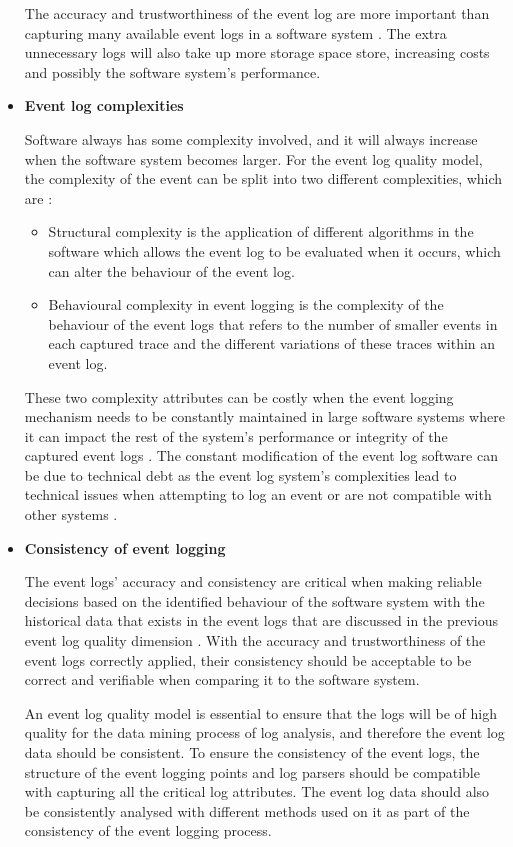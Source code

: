 \begin{itemize}
	The accuracy and trustworthiness of the event log are more important than capturing many available event logs in a software system \cite{Zhu2015, Jans2012}. The extra unnecessary logs will also take up more storage space store, increasing costs and possibly the software system's performance. 

	\item \textbf{Event log complexities}\par Software always has some complexity involved, and it will always increase when the software system becomes larger. For the event log quality model, the complexity of the event can be split into two different complexities, which are \cite{Kherbouche2017}:

	\begin{itemize}
		\item Structural complexity is the application of different algorithms in the software which allows the event log to be evaluated when it occurs, which can alter the behaviour of the event log.
		\item Behavioural complexity in event logging is the complexity of the behaviour of the event logs that refers to the number of smaller events in each captured trace and the different variations of these traces within an event log.
	\end{itemize}

	These two complexity attributes can be costly when the event logging mechanism needs to be constantly maintained in large software systems where it can impact the rest of the system's performance or integrity of the captured event logs \cite{Ogheneovo2014}. The constant modification of the event log software can be due to technical debt as the event log system's complexities lead to technical issues when attempting to log an event or are not compatible with other systems \cite{DeLeon-Sigg2020}.  

 	\item \textbf{Consistency of event logging}\par The event logs' accuracy and consistency are critical when making reliable decisions based on the identified behaviour of the software system with the historical data that exists in the event logs that are discussed in the previous event log quality dimension \cite{Stojanov2017, Kherbouche2017}. With the accuracy and trustworthiness of the event logs correctly applied, their consistency should be acceptable to be correct and verifiable when comparing it to the software system. \par An event log quality model is essential to ensure that the logs will be of high quality for the data mining process of log analysis, and therefore the event log data should be consistent. To ensure the consistency of the event logs, the structure of the event logging points and log parsers should be compatible with capturing all the critical log attributes. The event log data should also be consistently analysed with different methods used on it as part of the consistency of the event logging process.


\end{itemize}
